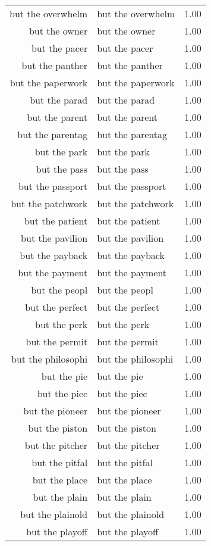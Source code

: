 \begin{table}[ht]
\begin{tabular}{rlr}
  but the overwhelm & but the overwhelm & 1.00 \\ 
  but the owner & but the owner & 1.00 \\ 
  but the pacer & but the pacer & 1.00 \\ 
  but the panther & but the panther & 1.00 \\ 
  but the paperwork & but the paperwork & 1.00 \\ 
  but the parad & but the parad & 1.00 \\ 
  but the parent & but the parent & 1.00 \\ 
  but the parentag & but the parentag & 1.00 \\ 
  but the park & but the park & 1.00 \\ 
  but the pass & but the pass & 1.00 \\ 
  but the passport & but the passport & 1.00 \\ 
  but the patchwork & but the patchwork & 1.00 \\ 
  but the patient & but the patient & 1.00 \\ 
  but the pavilion & but the pavilion & 1.00 \\ 
  but the payback & but the payback & 1.00 \\ 
  but the payment & but the payment & 1.00 \\ 
  but the peopl & but the peopl & 1.00 \\ 
  but the perfect & but the perfect & 1.00 \\ 
  but the perk & but the perk & 1.00 \\ 
  but the permit & but the permit & 1.00 \\ 
  but the philosophi & but the philosophi & 1.00 \\ 
  but the pie & but the pie & 1.00 \\ 
  but the piec & but the piec & 1.00 \\ 
  but the pioneer & but the pioneer & 1.00 \\ 
  but the piston & but the piston & 1.00 \\ 
  but the pitcher & but the pitcher & 1.00 \\ 
  but the pitfal & but the pitfal & 1.00 \\ 
  but the place & but the place & 1.00 \\ 
  but the plain & but the plain & 1.00 \\ 
  but the plainold & but the plainold & 1.00 \\ 
  but the playoff & but the playoff & 1.00 \\ 

\end{tabular}
\end{table}
